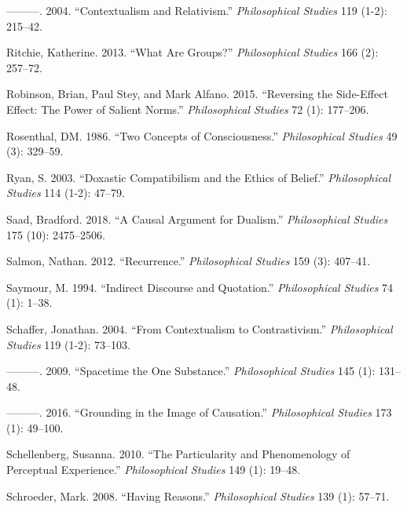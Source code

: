 \documentclass[
  10pt,
  letterpaper,
  DIV=11,
  numbers=noendperiod,
  twoside]{scrartcl}
\newlength{\cslhangindent}
\newenvironment{CSLReferences}[2] %
 {\begin{list}{}{%
  \setlength{\itemindent}{0pt}
  \setlength{\leftmargin}{0pt}
  \setlength{\parsep}{0pt}
  \ifodd #1
   \setlength{\leftmargin}{\cslhangindent}
   \setlength{\itemindent}{-1\cslhangindent}
  \fi
  \setlength{\itemsep}{#2\baselineskip}}}
 {\end{list}}
\begin{document}
\begin{CSLReferences}{1}{0}
---------. 2004. {``Contextualism and Relativism.''} \emph{Philosophical
Studies} 119 (1-2): 215--42.

Ritchie, Katherine. 2013. {``What Are Groups?''} \emph{Philosophical
Studies} 166 (2): 257--72.

Robinson, Brian, Paul Stey, and Mark Alfano. 2015. {``Reversing the
Side-Effect Effect: The Power of Salient Norms.''} \emph{Philosophical
Studies} 72 (1): 177--206.

Rosenthal, DM. 1986. {``Two Concepts of Consciousness.''}
\emph{Philosophical Studies} 49 (3): 329--59.

Ryan, S. 2003. {``Doxastic Compatibilism and the Ethics of Belief.''}
\emph{Philosophical Studies} 114 (1-2): 47--79.

Saad, Bradford. 2018. {``A Causal Argument for Dualism.''}
\emph{Philosophical Studies} 175 (10): 2475--2506.

Salmon, Nathan. 2012. {``Recurrence.''} \emph{Philosophical Studies} 159
(3): 407--41.

Saymour, M. 1994. {``Indirect Discourse and Quotation.''}
\emph{Philosophical Studies} 74 (1): 1--38.

Schaffer, Jonathan. 2004. {``From Contextualism to Contrastivism.''}
\emph{Philosophical Studies} 119 (1-2): 73--103.

---------. 2009. {``Spacetime the One Substance.''} \emph{Philosophical
Studies} 145 (1): 131--48.

---------. 2016. {``Grounding in the Image of Causation.''}
\emph{Philosophical Studies} 173 (1): 49--100.

Schellenberg, Susanna. 2010. {``The Particularity and Phenomenology of
Perceptual Experience.''} \emph{Philosophical Studies} 149 (1): 19--48.

Schroeder, Mark. 2008. {``Having Reasons.''} \emph{Philosophical
Studies} 139 (1): 57--71.


\end{CSLReferences}
\end{document}
